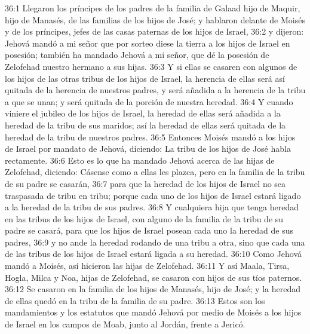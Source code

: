 36:1 Llegaron los príncipes de los padres de la familia de Galaad hijo de Maquir, hijo de Manasés, de las familias de los hijos de José; y hablaron delante de Moisés y de los príncipes, jefes de las casas paternas de los hijos de Israel,  
36:2 y dijeron: Jehová mandó a mi señor que por sorteo diese la tierra a los hijos de Israel en posesión; también ha mandado Jehová a mi señor, que dé la posesión de Zelofehad nuestro hermano a sus hijas.  
36:3 Y si ellas se casaren con algunos de los hijos de las otras tribus de los hijos de Israel, la herencia de ellas será así quitada de la herencia de nuestros padres, y será añadida a la herencia de la tribu a que se unan; y será quitada de la porción de nuestra heredad.  
36:4 Y cuando viniere el jubileo de los hijos de Israel, la heredad de ellas será añadida a la heredad de la tribu de sus maridos; así la heredad de ellas será quitada de la heredad de la tribu de nuestros padres.  
36:5 Entonces Moisés mandó a los hijos de Israel por mandato de Jehová, diciendo: La tribu de los hijos de José habla rectamente.  
36:6 Esto es lo que ha mandado Jehová acerca de las hijas de Zelofehad, diciendo: Cásense como a ellas les plazca, pero en la familia de la tribu de su padre se casarán,  
36:7 para que la heredad de los hijos de Israel no sea traspasada de tribu en tribu; porque cada uno de los hijos de Israel estará ligado a la heredad de la tribu de sus padres.  
36:8 Y cualquiera hija que tenga heredad en las tribus de los hijos de Israel, con alguno de la familia de la tribu de su padre se casará, para que los hijos de Israel posean cada uno la heredad de sus padres,  
36:9 y no ande la heredad rodando de una tribu a otra, sino que cada una de las tribus de los hijos de Israel estará ligada a su heredad.  
36:10 Como Jehová mandó a Moisés, así hicieron las hijas de Zelofehad.  
36:11 Y así Maala, Tirsa, Hogla, Milca y Noa, hijas de Zelofehad, se casaron con hijos de sus tíos paternos.  
36:12 Se casaron en la familia de los hijos de Manasés, hijo de José; y la heredad de ellas quedó en la tribu de la familia de su padre.  
36:13 Estos son los mandamientos y los estatutos que mandó Jehová por medio de Moisés a los hijos de Israel en los campos de Moab, junto al Jordán, frente a Jericó.
